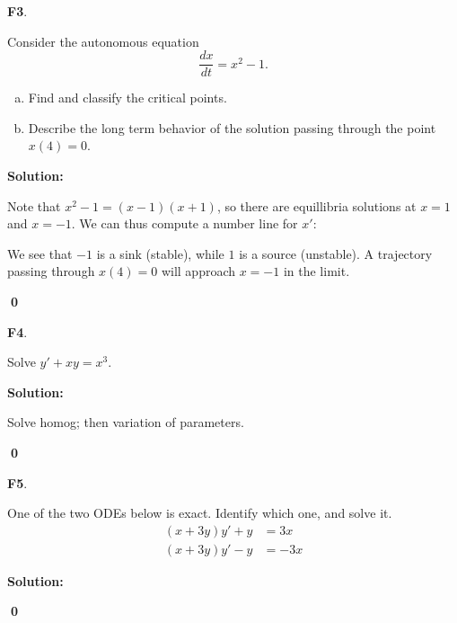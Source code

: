 \documentclass{article}
\newenvironment{problem}[1]
{
  \begin{flushleft}
  \textbf{#1}.
  \ignorespaces
}
{
  \end{flushleft}
}
\newenvironment{solution}
{
  \ignorespaces
  \textbf{Solution:}
}
{
  \ignorespacesafterend
  \begin{flushright}
  {\bfseries \qed}
  \end{flushright}
}
\begin{document}
\begin{problem}{F3}
Consider the autonomous equation 
\[\frac{dx}{dt} = x^2-1.\]  
\begin{enumerate}[(a)]
\item Find and classify the critical points.
\item Describe the long term behavior of the solution passing through the point \( x(4)=0 \).
\end{enumerate}
\end{problem}
\begin{solution}

Note that \(x^2-1=(x-1)(x+1)\), so there are equillibria solutions at \(x=1\) and \(x=-1\).  We can thus compute a number line for \(x'\):

\begin{center}
\end{center}

We see that \(-1\) is a sink (stable), while \(1\) is a source (unstable).  A trajectory passing through \(x(4)=0\) will approach \(x=-1\) in the limit.
\end{solution}

\begin{problem}{F4}
Solve \(y'+xy=x^3\).
\end{problem}
\begin{solution}
Solve homog; then variation of parameters.
\end{solution}

\begin{problem}{F5}
One of the two ODEs below is exact.  Identify which one, and solve it.
\begin{align*}
 (x + 3y)y'+y &=3x \\ %
 (x + 3y)y'-y &=-3x  
\end{align*}
\end{problem}
\begin{solution}

\end{solution}
\end{document}
